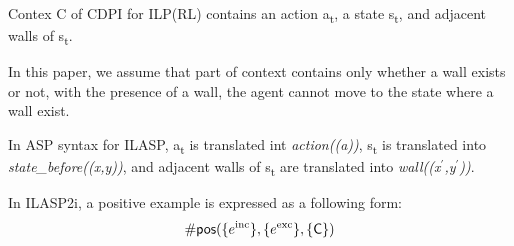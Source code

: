 \begin{defn}
Contex C of CDPI for ILP(RL) contains an action a\textsubscript{t}, a state s\textsubscript{t}, and adjacent walls of s\textsubscript{t}.
\end{defn}

In this paper, we assume that part of context contains only whether a wall exists or not, with the presence of a wall, the agent cannot move to the state where a wall exist.

In ASP syntax for ILASP, a\textsubscript{t} is translated int \textit{action((a))}, s\textsubscript{t} is translated into \textit{state\_before((x,y))}, and adjacent walls of s\textsubscript{t} are translated into \textit{wall((x$^\prime$,y$^\prime$))}.

In ILASP2i, a positive example is expressed as a following form:
\begin{equation}
\begin{split}
    \textsf{\#pos}(\{e\textsuperscript{inc}\}, \{e\textsuperscript{exc}\}, \textsf{\{C\}})
\end{split}
\end{equation}



